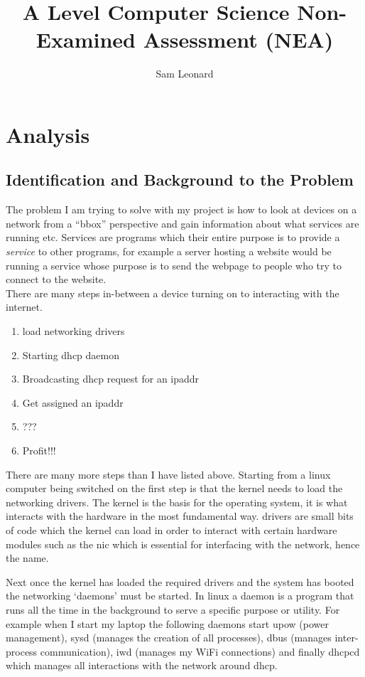 \documentclass[titlepage]{article}
\author{Sam Leonard}
\title{A Level Computer Science Non-Examined Assessment (NEA)}
\date{} %
\let\Oldsection\section{}
\renewcommand{\section}{\FloatBarrier\Oldsection}
\let\Oldsubsection\subsection{}
\renewcommand{\subsection}{\FloatBarrier\Oldsubsection}
\begin{document}
\maketitle

\tableofcontents

\section{Analysis}

\subsection{Identification and Background to the Problem}

The problem I am trying to solve with my project is how to look at devices on a network
from a ``\gls{bbox}'' perspective and gain information about what \glspl{service} are running etc.
Services are programs which their entire purpose is to provide a \textit{\gls{service}} to other
programs, for example a server hosting a website would be running a \gls{service} whose purpose
is to send the webpage to people who try to connect to the website. \\
There are many steps in-between a device turning on to interacting with the internet.

\begin{enumerate}
  \item{load networking \glspl{driver}}
  \item{Starting \gls{dhcp} \gls{daemon}}
  \item{Broadcasting \gls{dhcp} request for an \gls{ipaddr}}
  \item{Get assigned an \gls{ipaddr}}
  \item{???}
  \item{Profit!!!}
\end{enumerate}

There are many more steps than I have listed above. Starting from a linux computer being switched on
the first step is that the \gls{kernel} needs to load the networking \glspl{driver}. The \gls{kernel} is the basis for the
operating system, it is what interacts with the hardware in the most fundamental way. \glspl{driver} are small
bits of code which the \gls{kernel} can load in order to interact with certain hardware modules such as the
\gls{nic} which is essential for interfacing with the network, hence the name.

Next once the \gls{kernel} has loaded the required \glspl{driver} and the system has booted the networking
`\glspl{daemon}' must be started. In linux a \gls{daemon} is a program that runs all the time in the background
to serve a specific purpose or utility. For example when I start my laptop the following \glspl{daemon} start
\gls{upow} (power management), \gls{sysd} (manages the creation of all processes), \gls{dbus} (manages
inter-process communication), iwd (manages my WiFi connections) and finally \gls{dhcpcd} which manages all
interactions with the network around \gls{dhcp}.
\end{document}
